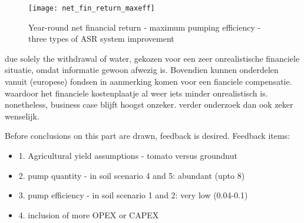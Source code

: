 \begin{figure}[h!]
 \centering
 \texttt{[image: net\_fin\_return\_maxeff]}
 \captionsetup{justification=centering} 
 \caption{Year-round net financial return - maximum pumping efficiency - three types of ASR system improvement}
 \label{fig:net_fin_return_maxeff}
\end{figure}

 due solely the withdrawal of water,
 gekozen voor een zeer onrealistische financiele situatie, omdat informatie gewoon afwezig is. Bovendien kunnen onderdelen vanuit (europese) fondsen in aanmerking komen voor een fianciele compensatie. waardoor het financiele kostenplaatje al weer iets minder onrealistisch is. nonetheless, business case blijft hoogst onzeker. verder onderzoek dan ook zeker wenselijk. 


Before conclusions on this part are drawn, feedback is desired. Feedback items: \\
\begin{itemize}
\item{1.} Agricultural yield assumptions - tomato versus groundnut 
\item{2.} pump quantity - in soil scenario 4 and 5: abundant (upto 8) 
\item{3.} pump efficiency - in soil scenario 1 and 2: very low (0.04-0.1)
\item{4.} inclusion of more OPEX or CAPEX
\end{itemize}